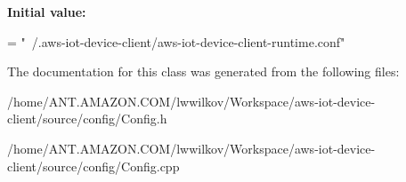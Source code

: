 {\bfseries Initial value\+:}
\begin{DoxyCode}
=
                    \textcolor{stringliteral}{"~/.aws-iot-device-client/aws-iot-device-client-runtime.conf"}
\end{DoxyCode}


The documentation for this class was generated from the following files\+:\begin{DoxyCompactItemize}
\item 
/home/\+A\+N\+T.\+A\+M\+A\+Z\+O\+N.\+C\+O\+M/lwwilkov/\+Workspace/aws-\/iot-\/device-\/client/source/config/Config.\+h\item 
/home/\+A\+N\+T.\+A\+M\+A\+Z\+O\+N.\+C\+O\+M/lwwilkov/\+Workspace/aws-\/iot-\/device-\/client/source/config/Config.\+cpp\end{DoxyCompactItemize}

